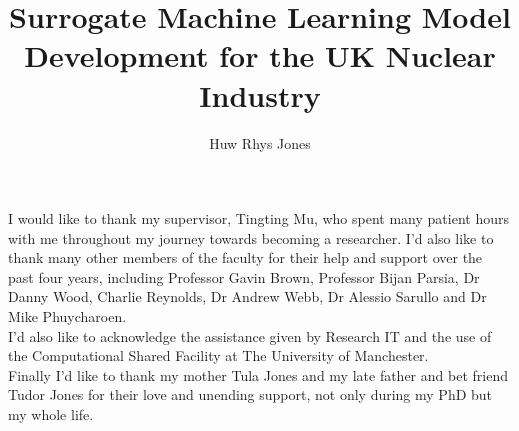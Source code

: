 \documentclass[12pt,PhD,wordcount,anon]{muthesis}
\begin{document}

\title{Surrogate Machine Learning Model Development for the UK Nuclear Industry}
\author{Huw Rhys Jones}

\beforeabstract



\afterabstract

I would like to thank my supervisor, Tingting Mu, who spent many patient hours with me throughout my journey towards becoming a researcher. I'd also like to thank many other members of the faculty for their help and support over the past four years, including Professor Gavin Brown, Professor Bijan Parsia, Dr Danny Wood, Charlie Reynolds, Dr Andrew Webb, Dr Alessio Sarullo and Dr Mike Phuycharoen. 
\\

\noindent
I'd also like to acknowledge the assistance
given by Research IT and the use of the Computational
Shared Facility at The University of Manchester.
\\

\noindent
Finally I'd like to thank my mother Tula Jones and my late father and bet friend Tudor Jones for their love and unending support, not only during my PhD but my whole life.
\afterpreface













\end{document}
